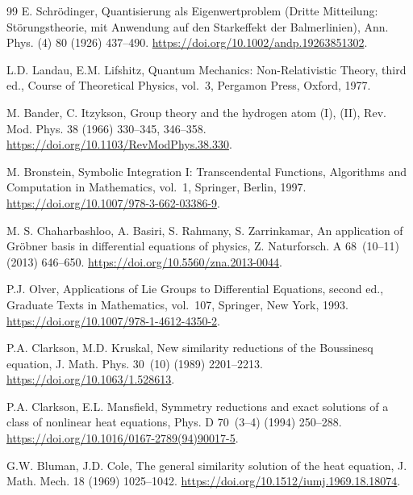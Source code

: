 \documentclass{article}
\theoremstyle{definition}
\theoremstyle{plain}
\begin{document}
\begin{thebibliography}{99}
E. Schr\"odinger, Quantisierung als Eigenwertproblem (Dritte Mitteilung:
St\"orungstheorie, mit Anwendung auf den Starkeffekt der Balmerlinien),
Ann. Phys. (4) 80 (1926) 437--490. \url{https://doi.org/10.1002/andp.19263851302}.

L.D. Landau, E.M. Lifshitz, Quantum Mechanics: Non-Relativistic Theory, third ed., Course of Theoretical Physics, vol.~3, Pergamon Press, Oxford, 1977.

M. Bander, C. Itzykson, Group theory and the hydrogen atom (I), (II), Rev. Mod. Phys. 38 (1966) 330--345, 346--358. \url{https://doi.org/10.1103/RevModPhys.38.330}.

M. Bronstein, Symbolic Integration I: Transcendental Functions, Algorithms and
Computation in Mathematics, vol.~1, Springer, Berlin, 1997.
\url{https://doi.org/10.1007/978-3-662-03386-9}.

M. S. Chaharbashloo, A. Basiri, S. Rahmany, S. Zarrinkamar, An application of Gr\"obner basis in differential equations of physics, Z. Naturforsch. A 68~(10--11) (2013) 646--650. \url{https://doi.org/10.5560/zna.2013-0044}.

P.J. Olver, Applications of Lie Groups to Differential Equations, second ed., Graduate Texts in Mathematics, vol.~107, Springer, New York, 1993. \url{https://doi.org/10.1007/978-1-4612-4350-2}.

P.A. Clarkson, M.D. Kruskal, New similarity reductions of the Boussinesq equation, J. Math. Phys. 30~(10) (1989) 2201--2213. \url{https://doi.org/10.1063/1.528613}.

P.A. Clarkson, E.L. Mansfield, Symmetry reductions and exact solutions of a class of nonlinear heat equations, Phys. D 70~(3--4) (1994) 250--288. \url{https://doi.org/10.1016/0167-2789(94)90017-5}.

G.W. Bluman, J.D. Cole, The general similarity solution of the heat equation, J. Math. Mech. 18 (1969) 1025--1042. \url{https://doi.org/10.1512/iumj.1969.18.18074}.

\end{thebibliography}

%
\end{document}
